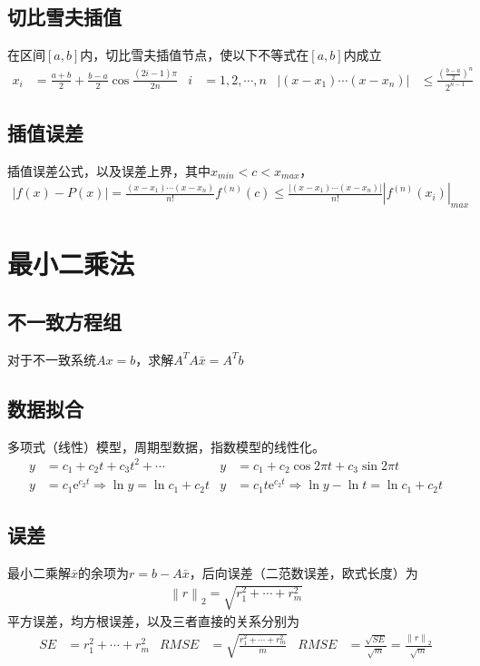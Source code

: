 \documentclass[twocolumn]{article}
\begin{document}
\subsection{切比雪夫插值}
在区间$[a,b]$内，切比雪夫插值节点，使以下不等式在$[a,b]$内成立
\begin{align*}
    x_i & =\frac{a+b}{2}+\frac{b-a}{2}\cos{\frac{(2i-1)\pi}{2n}} & i&=1,2,\cdots,n&    \left| (x-x_1)\cdots(x-x_n) \right|&\leqslant \frac{\left( \frac{b-a}{2} \right)^n}{2^{n-1}}
\end{align*}

\subsection{插值误差}
插值误差公式，以及误差上界，其中$x_{min}<c<x_{max}$，
\begin{align*}
    \left| f(x)-P(x) \right|=\frac{(x-x_1)\cdots(x-x_n)}{n!}f^{(n)}(c)  \leqslant\frac{\left| (x-x_1)\cdots(x-x_n) \right|}{n!}\left| f^{(n)}(x_i) \right|_{max}
\end{align*}

\section{最小二乘法}

\subsection{不一致方程组}
对于不一致系统$Ax=b$，求解$A^TA\bar{x}=A^Tb$

\subsection{数据拟合}
多项式（线性）模型，周期型数据，指数模型的线性化。
\begin{align*}
    y & =c_1+c_2t+c_3t^2+\cdots                                & y & =c_1+c_2\cos{2\pi t}+c_3\sin{2\pi t}                           \\
    y & =c_1\mathrm{e}^{c_2t} \Rightarrow \ln{y}=\ln{c_1}+c_2t & y & =c_1t\mathrm{e}^{c_2t} \Rightarrow \ln{y}-\ln{t}=\ln{c_1}+c_2t
\end{align*}

\subsection{误差}
最小二乘解$\bar{x}$的余项为$r=b-A\bar{x}$，后向误差（二范数误差，欧式长度）为
\begin{align*}
    \left\| r \right\|_2=\sqrt{r_1^2+\cdots+r_m^2}
\end{align*}
平方误差，均方根误差，以及三者直接的关系分别为
\begin{align*}
    SE & =r_1^2+\cdots+r_m^2 & RMSE & =\sqrt{\frac{r_1^2+\cdots+r_m^2}{m}} & RMSE & =\frac{\sqrt{SE}}{\sqrt{m}}=\frac{\left\| r \right\|_2}{\sqrt{m}}
\end{align*}
\end{document}
